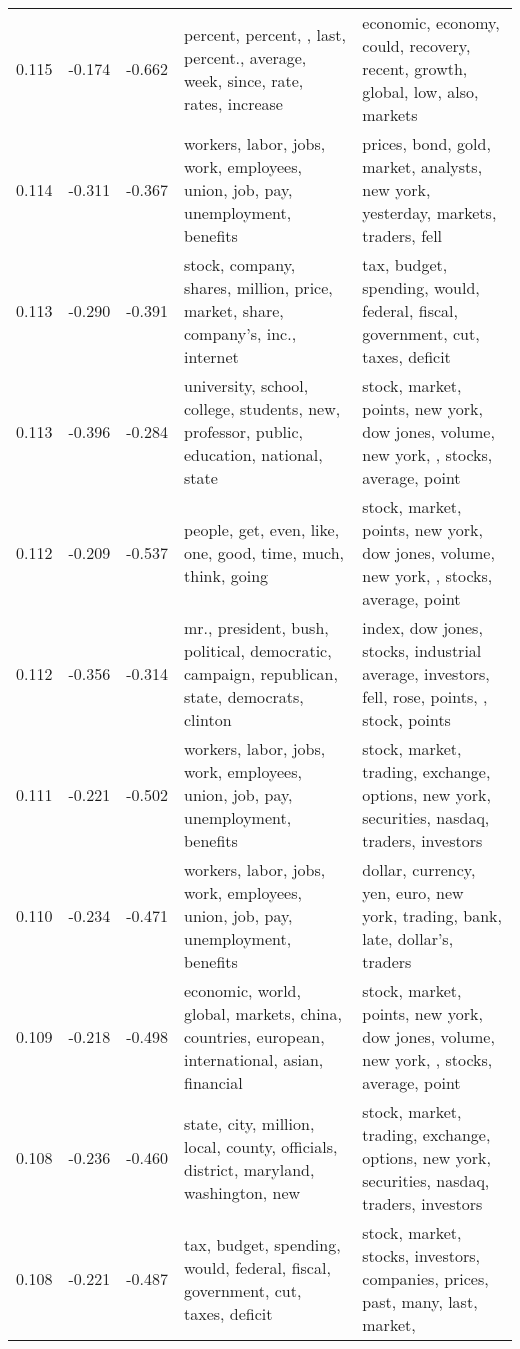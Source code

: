 \begin{tabular}{cccp{5cm}p{5cm}}
0.115 & -0.174 & -0.662 & percent, percent, , last, percent., average, week, since, rate, rates, increase & economic, economy, could, recovery, recent, growth, global, low, also, markets \\
0.114 & -0.311 & -0.367 & workers, labor, jobs, work, employees, union, job, pay, unemployment, benefits & prices, bond, gold, market, analysts, new york, yesterday, markets, traders, fell \\
0.113 & -0.290 & -0.391 & stock, company, shares, million, price, market, share, company's, inc., internet & tax, budget, spending, would, federal, fiscal, government, cut, taxes, deficit \\
0.113 & -0.396 & -0.284 & university, school, college, students, new, professor, public, education, national, state & stock, market, points, new york, dow jones, volume, new york, , stocks, average, point \\
0.112 & -0.209 & -0.537 & people, get, even, like, one, good, time, much, think, going & stock, market, points, new york, dow jones, volume, new york, , stocks, average, point \\
0.112 & -0.356 & -0.314 & mr., president, bush, political, democratic, campaign, republican, state, democrats, clinton & index, dow jones, stocks, industrial average, investors, fell, rose, points, , stock, points \\
0.111 & -0.221 & -0.502 & workers, labor, jobs, work, employees, union, job, pay, unemployment, benefits & stock, market, trading, exchange, options, new york, securities, nasdaq, traders, investors \\
0.110 & -0.234 & -0.471 & workers, labor, jobs, work, employees, union, job, pay, unemployment, benefits & dollar, currency, yen, euro, new york, trading, bank, late, dollar's, traders \\
0.109 & -0.218 & -0.498 & economic, world, global, markets, china, countries, european, international, asian, financial & stock, market, points, new york, dow jones, volume, new york, , stocks, average, point \\
0.108 & -0.236 & -0.460 & state, city, million, local, county, officials, district, maryland, washington, new & stock, market, trading, exchange, options, new york, securities, nasdaq, traders, investors \\
0.108 & -0.221 & -0.487 & tax, budget, spending, would, federal, fiscal, government, cut, taxes, deficit & stock, market, stocks, investors, companies, prices, past, many, last, market,  \\

\end{tabular}
